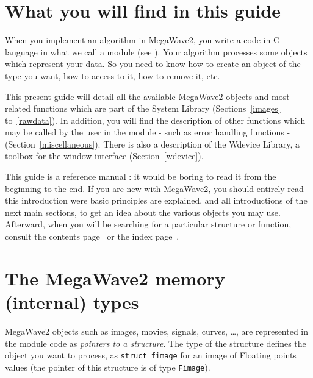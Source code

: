 %
%

\section{What you will find in this guide}

\label{intro_guide}

When you implement an algorithm in MegaWave2, you write a code in C language 
in what we call a module (see \volI). Your algorithm processes some objects
which represent your data. So you need to know how to create an object of
the type you want, how to access to it, how to remove it, etc.

This present guide will detail all the available MegaWave2 objects and most
related functions which are part of the System Library 
(Sections~\ref{images} to~\ref{rawdata}).
In addition, you will find the description of other functions which may
be called by the user in the module - such as error handling functions -
(Section~\ref{miscellaneous}).
There is also a description of the Wdevice Library, a toolbox for the
window interface (Section~\ref{wdevice}).

This guide is a reference manual : it would be boring to read it from the
beginning to the end. If you are new with MegaWave2, you should entirely read this
introduction were basic principles are explained, and all introductions of 
the next main sections, to get an idea about the various objects you may use.
Afterward, when you will be searching for a particular structure or function, consult 
the contents page~\pageref{contents} or the index page~\pageref{index}.


\section{The MegaWave2 memory (internal) types}

\label{intro_memory-types}



MegaWave2 objects such as images, movies, signals, curves, \ldots, are 
represented in the module code as {\em pointers to a structure}.
The type of the structure defines the object you want to process, as
\verb+struct fimage+ for an image of Floating points values (the pointer of
this structure is of type \verb+Fimage+).


